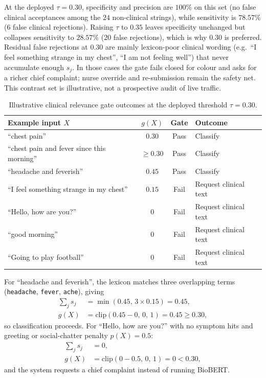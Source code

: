 At the deployed \(\tau=0.30\), specificity and precision are \(100\%\) on this set (no false clinical acceptances among the \(24\) non-clinical strings), while sensitivity is \(78.57\%\) (\(6\) false clinical rejections). Raising \(\tau\) to \(0.35\) leaves specificity unchanged but collapses sensitivity to \(28.57\%\) (\(20\) false rejections), which is why \(0.30\) is preferred. Residual false rejections at \(0.30\) are mainly lexicon-poor clinical wording (e.g.\ ``I feel something strange in my chest'', ``I am not feeling well'') that never accumulate enough \(s_j\). In those cases the gate fails closed for colour and asks for a richer chief complaint; nurse override and re-submission remain the safety net. This contrast set is illustrative, not a prospective audit of live \examplehospital{} traffic.

\begin{table}[H]
\centering
\small
\begin{tabular}{|p{5.4cm}|c|c|l|}
\hline
\textbf{Example input \(X\)} & \(g(X)\) & Gate & Outcome \\
\hline
``chest pain'' & \(0.30\) & Pass & Classify \\
``chest pain and fever since this morning'' & \(\geq 0.30\) & Pass & Classify \\
``headache and feverish'' & \(0.45\) & Pass & Classify \\
``I feel something strange in my chest'' & \(0.15\) & Fail & Request clinical text \\
``Hello, how are you?'' & \(0\) & Fail & Request clinical text \\
``good morning'' & \(0\) & Fail & Request clinical text \\
``Going to play football'' & \(0\) & Fail & Request clinical text \\
\hline
\end{tabular}
\caption{Illustrative clinical relevance gate outcomes at the deployed threshold \(\tau=0.30\).}
\label{tab:gate-calibration}
\end{table}

\begin{example}
For ``headache and feverish'', the lexicon matches three overlapping terms (\texttt{headache}, \texttt{fever}, \texttt{ache}), giving
\begin{align*}
  \sum_j s_j &= \min(0.45,\, 3\times 0.15) = 0.45, \\
  g(X) &= \mathrm{clip}(0.45 - 0,\, 0,\, 1) = 0.45 \geq 0.30,
\end{align*}
so classification proceeds. For ``Hello, how are you?'' with no symptom hits and greeting or social-chatter penalty \(p(X)=0.5\):
\begin{align*}
  \sum_j s_j &= 0, \\
  g(X) &= \mathrm{clip}(0 - 0.5,\, 0,\, 1) = 0 < 0.30,
\end{align*}
and the system requests a chief complaint instead of running BioBERT.
\end{example}

